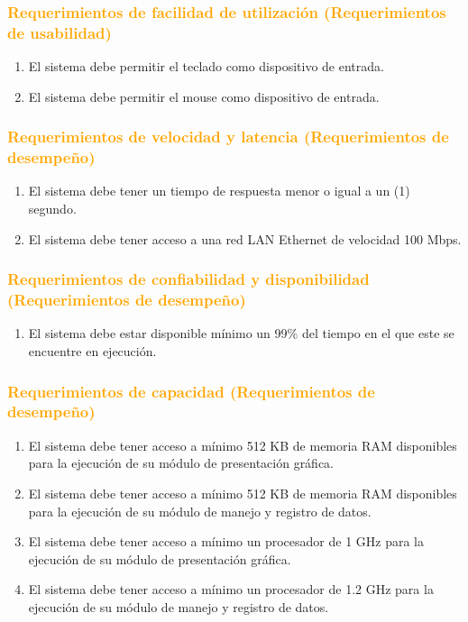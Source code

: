\subsubsection{\textcolor{orange}{Requerimientos de facilidad de utilización
(Requerimientos de usabilidad)}}
\begin{enumerate}
\item El sistema debe permitir el teclado como dispositivo de entrada.
\item El sistema debe permitir el mouse como dispositivo de entrada.
\end{enumerate}

\subsubsection{\textcolor{orange}{Requerimientos de velocidad y latencia
(Requerimientos de desempeño)}}
\begin{enumerate}
\item El sistema debe tener un tiempo de respuesta menor o igual a un (1)
segundo.
\item El sistema debe tener acceso a una red LAN Ethernet de velocidad 100 Mbps.
\end{enumerate}

\subsubsection{\textcolor{orange}{Requerimientos de confiabilidad y
disponibilidad (Requerimientos de desempeño)}}
\begin{enumerate}
\item El sistema debe estar disponible mínimo un 99\% del tiempo en el que este
se encuentre en ejecución.
\end{enumerate}

\subsubsection{\textcolor{orange}{Requerimientos de capacidad (Requerimientos de
desempeño)}}
\begin{enumerate}
\item El sistema debe tener acceso a mínimo 512 KB de memoria RAM disponibles
para la ejecución de su módulo de presentación gráfica.
\item El sistema debe tener acceso a mínimo 512 KB de memoria RAM disponibles
para la ejecución de su módulo de manejo y registro de datos.
\item El sistema debe tener acceso a mínimo un procesador de 1 GHz para la
ejecución de su módulo de presentación gráfica.
\item El sistema debe tener acceso a mínimo un procesador de 1.2 GHz para la
ejecución de su módulo de manejo y registro de datos.
\end{enumerate}
 
